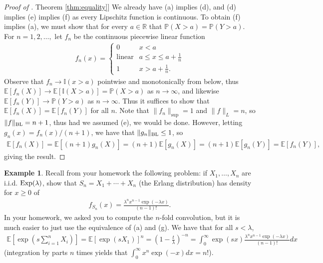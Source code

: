 \documentclass{article}
\theoremstyle{definition}
\newtheorem{example}{Example}
\renewcommand{\P}{\mathbb P}
\newcommand{\E}{\mathbb E}
\newcommand{\1}{\mathbb I}
\newcommand{\R}{\mathbb R}
\newcommand{\Exp}{\mathop{\text{\rm Exp}}}
\newcommand{\BL}{\mathop{\text{\rm BL}}}
\newcommand{\thmhref}[1]{\hyperref[#1]{Theorem \ref{#1}}}
\begin{document}
\begin{proof}[Proof of \thmhref{thm:equality}]
  We already have (a) implies (d), and (d) implies (e) implies (f) as
  every Lipschitz function is continuous.  To obtain (f) implies (a),
  we must show that for every $a \in \R$ that $\P(X > a) = \P(Y
  > a)$.  For $n = 1,2,\ldots,$ let $f_n$ be the continuous piecewise linear function
  \begin{align*}
    f_n(x) =
    \begin{cases}
      0& x < a \\
      \text{linear}& a \leq x \leq a + \frac 1n\\
      1 & x > a+\frac 1n.
    \end{cases}
  \end{align*}
  Observe that $f_n \to \1(x > a)$ pointwise and monotonically from
  below, thus $\E[f_n(X)] \to \E[\1(X > a)] = \P(X > a)$ as $n \to
  \infty$, and likewise $\E[f_n(Y)] \to \P(Y > a)$ as $n \to \infty$.
  Thus it suffices to show that $\E[f_n(X)] = \E[f_n(Y)]$ for all $n$.
  Note that $\|f_n\|_{\sup} = 1$ and $\|f\|_L = n$, so $\|f\|_{\BL} =
  n+1$, thus had we assumed (e), we would be done.  However, letting
  $g_n(x) = f_n(x)/(n+1)$, we have that $\|g_n\|_{\BL} \leq 1$, so
  \begin{align*}
    \E[f_n(X)] = \E\left[(n+1) g_n(X)\right] = (n+1)\E\left[ g_n(X)\right] = (n+1)\E\left[ g_n(Y)\right] = \E[f_n(Y)],
  \end{align*}
  giving the result.  
\end{proof}
\begin{small}
  \begin{example}
  Recall from your homework the following problem: if $X_1,\ldots,X_n$
  are i.i.d. $\Exp(\lambda)$, show that $S_n = X_1 + \cdots + X_n$
  (the Erlang distribution) has density for $x \geq 0$ of
  \begin{align*}
    f_{S_n}(x) = \frac{\lambda^n x^{n-1} \exp(-\lambda x)}{(n-1)!}.
  \end{align*}
  In your homework, we asked you to compute the $n$-fold convolution,
  but it is much easier to just use the equivalence of (a) and (g).
  We have that for all $s < \lambda$,
  \begin{align*}
    \E\left[\exp\left(s \sum_{i=1}^n X_i\right)\right] = \E[\exp(s
    X_1)]^n = \left(1 - \frac t \lambda\right)^{-n} = \int_0^\infty
    \exp(sx)\frac{\lambda^n x^{n-1} \exp(-\lambda x)}{(n-1)!}dx
  \end{align*}
  (integration by parts $n$ times yields that $\int_0^\infty x^n \exp(-x)dx = n!$).
\end{example}
\end{small}
\end{document}
